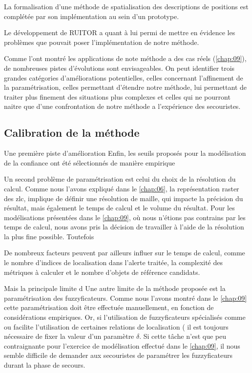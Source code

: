 La formalisation d'une méthode de spatialisation des descriptions de
positions est complétée par son implémentation au sein d'un prototype.




Le développement de RUITOR a quant à lui permi de mettre en évidence
les problèmes que pouvait poser l'implémentation de notre méthode.


Comme l'ont montré les applications de note méthode a des cas réels
(\autoref{chap:09}), de nombreuses pistes d'évolutions sont
envisageables. On peut identifier trois grandes catégories
d'améliorations potentielles, celles concernant l'affinement de la
paramétrisation, celles permettant d'étendre notre méthode, lui
permettant de traiter plus finement des situations plus complexes et
celles qui ne pourront naitre que d'une confrontation de notre méthode
a l'expérience des secouristes.

\subsection*{Calibration de la méthode}

Une première piste d'amélioration
Enfin, les seuils proposés pour la modélisation de la confiance ont
été sélectionnés de manière empirique


Un second problème de paramétrisation est celui du choix de la
résolution du calcul. Comme nous l'avons expliqué dans le
\autoref{chap:06}, la représentation raster des \ac{zlc}, implique de
définir une résolution de maille, qui impacte la précision du
résultat, mais également le temps de calcul et le volume du
résultat. Pour les modélisations présentées dans le \autoref{chap:09},
où nous n'étions pas contrains par les temps de calcul, nous avons
pris la décision de travailler à l'aide de la résolution la plus fine
possible. Toutefois


De nombreux facteurs peuvent par ailleurs influer sur le temps de
calcul, comme le nombre d'indices de localisation dans l'alerte
traitée, la complexité des métriques à calculer et le nombre d'objets
de référence candidats.


Mais la principale limite d
%
Une autre limite de la méthode proposée est la paramétrisation des
fuzzyficateurs. Comme nous l'avons montré dans le \autoref{chap:09}
cette paramétrisation doit être effectuée manuellement, en fonction de
considérations empiriques. Or, si l'utilisation de fuzzyficateurs
spécialisés comme  ou 
facilite l'utilisation de certaines relations de localisation (\eg
{} il est toujours nécessaire de fixer la valeur
d'un paramètre \(\delta\). Si cette tâche n'est que peu contraignante
pour l'exercice de modélisation effectué dans le \autoref{chap:09}, il
nous semble difficile de demander aux secouristes de paramétrer les
fuzzyficateurs durant la phase de secours.

